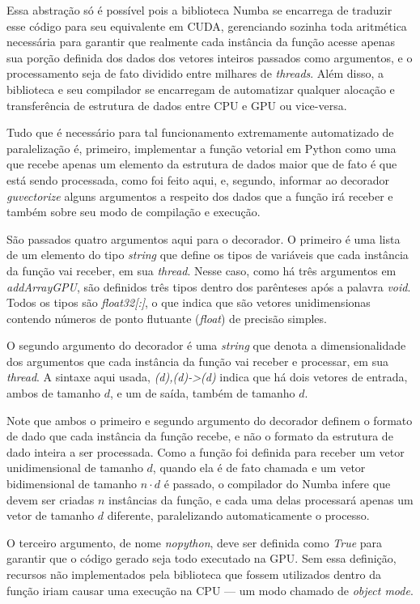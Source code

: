 \documentclass[12pt,
openright, 
oneside, %
a4paper,    %
brazil]{facom-ufu-abntex2}
\begin{document}
Essa abstração só é possível pois a biblioteca Numba se encarrega de traduzir esse código para seu equivalente em CUDA, gerenciando sozinha toda aritmética necessária para garantir que realmente cada instância da função acesse apenas sua porção definida dos dados dos vetores inteiros passados como argumentos, e o processamento seja de fato dividido entre milhares de \textit{threads}. Além disso, a biblioteca e seu compilador se encarregam de automatizar qualquer alocação e transferência de estrutura de dados entre CPU e GPU ou vice-versa.

Tudo que é necessário para tal funcionamento extremamente automatizado de paralelização é, primeiro, implementar a função vetorial em Python como uma que recebe apenas um elemento da estrutura de dados maior que de fato é que está sendo processada, como foi feito aqui, e, segundo, informar ao decorador \textit{guvectorize} alguns argumentos a respeito dos dados que a função irá receber e também sobre seu modo de compilação e execução.

São passados quatro argumentos aqui para o decorador. O primeiro é uma lista de um elemento do tipo \textit{string} que define os tipos de variáveis que cada instância da função vai receber, em sua \textit{thread}. Nesse caso, como há três argumentos em \textit{addArrayGPU}, são definidos três tipos dentro dos parênteses após a palavra \textit{void}. Todos os tipos são \textit{float32[:]}, o que indica que são vetores unidimensionas contendo números de ponto flutuante (\textit{float}) de precisão simples.

O segundo argumento do decorador é uma \textit{string} que denota a dimensionalidade dos argumentos que cada instância da função vai receber e processar, em sua \textit{thread}. A sintaxe aqui usada, \textit{(d),(d)->(d)} indica que há dois vetores de entrada, ambos de tamanho $d$, e um de saída, também de tamanho $d$.

Note que ambos o primeiro e segundo argumento do decorador definem o formato de dado que cada instância da função recebe, e não o formato da estrutura de dado inteira a ser processada. Como a função foi definida para receber um vetor unidimensional de tamanho $d$, quando ela é de fato chamada e um vetor bidimensional de tamanho $n \cdot d$ é passado, o compilador do Numba infere que devem ser criadas $n$ instâncias da função, e cada uma delas processará apenas um vetor de tamanho $d$ diferente, paralelizando automaticamente o processo.

O terceiro argumento, de nome \textit{nopython}, deve ser definida como \textit{True} para garantir que o código gerado seja todo executado na GPU. Sem essa definição, recursos não implementados pela biblioteca que fossem utilizados dentro da função iriam causar uma execução na CPU --- um modo chamado de \textit{object mode}.
\end{document}
